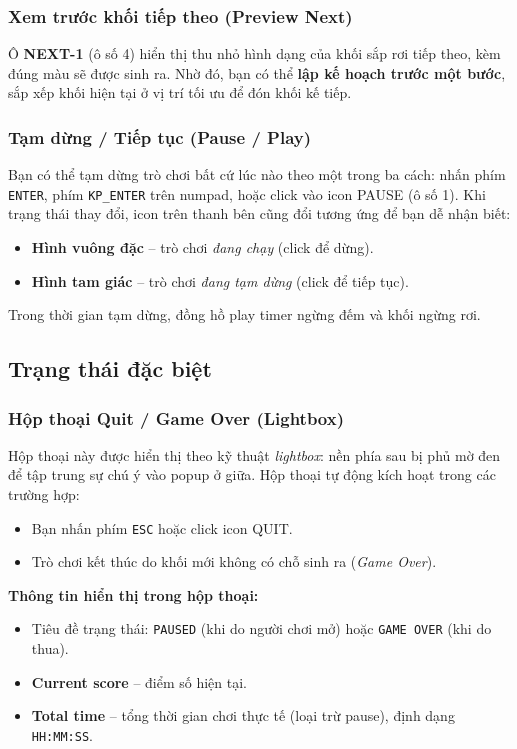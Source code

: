 \documentclass[12pt,a4paper]{article}
\begin{document}
\subsubsection{Xem trước khối tiếp theo (Preview Next)}
Ô \textbf{NEXT-1} (ô số 4) hiển thị thu nhỏ hình dạng của khối sắp rơi tiếp theo, kèm đúng màu sẽ được sinh ra. Nhờ đó, bạn có thể \textbf{lập kế hoạch trước một bước}, sắp xếp khối hiện tại ở vị trí tối ưu để đón khối kế tiếp.

\subsubsection{Tạm dừng / Tiếp tục (Pause / Play)}
Bạn có thể tạm dừng trò chơi bất cứ lúc nào theo một trong ba cách: nhấn phím \texttt{ENTER}, phím \texttt{KP\_ENTER} trên numpad, hoặc click vào icon PAUSE (ô số 1). Khi trạng thái thay đổi, icon trên thanh bên cũng đổi tương ứng để bạn dễ nhận biết:
\begin{itemize}
    \item \textbf{Hình vuông đặc} -- trò chơi \textit{đang chạy} (click để dừng).
    \item \textbf{Hình tam giác} -- trò chơi \textit{đang tạm dừng} (click để tiếp tục).
\end{itemize}
Trong thời gian tạm dừng, đồng hồ play timer ngừng đếm và khối ngừng rơi.

\subsection{Trạng thái đặc biệt}

\subsubsection{Hộp thoại Quit / Game Over (Lightbox)}
Hộp thoại này được hiển thị theo kỹ thuật \textit{lightbox}: nền phía sau bị phủ mờ đen để tập trung sự chú ý vào popup ở giữa. Hộp thoại tự động kích hoạt trong các trường hợp:
\begin{itemize}
    \item Bạn nhấn phím \texttt{ESC} hoặc click icon QUIT.
    \item Trò chơi kết thúc do khối mới không có chỗ sinh ra (\textit{Game Over}).
\end{itemize}

\noindent\textbf{Thông tin hiển thị trong hộp thoại:}
\begin{itemize}
    \item Tiêu đề trạng thái: \texttt{PAUSED} (khi do người chơi mở) hoặc \texttt{GAME OVER} (khi do thua).
    \item \textbf{Current score} -- điểm số hiện tại.
    \item \textbf{Total time} -- tổng thời gian chơi thực tế (loại trừ pause), định dạng \texttt{HH:MM:SS}.
\end{itemize}
\end{document}

